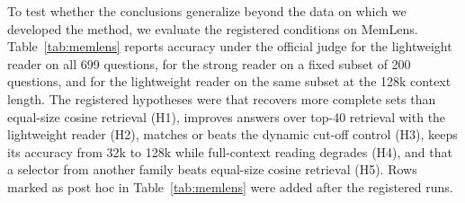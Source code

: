 To test whether the conclusions generalize beyond the data on which we developed the method, we evaluate the registered conditions on MemLens. Table~\ref{tab:memlens} reports accuracy under the official judge for the lightweight reader on all 699 questions, for the strong reader on a fixed subset of 200 questions, and for the lightweight reader on the same subset at the 128k context length. The registered hypotheses were that \qss{} recovers more complete sets than equal-size cosine retrieval (H1), improves answers over top-40 retrieval with the lightweight reader (H2), matches or beats the dynamic cut-off control (H3), keeps its accuracy from 32k to 128k while full-context reading degrades (H4), and that a selector from another family beats equal-size cosine retrieval (H5). Rows marked as post hoc in Table~\ref{tab:memlens} were added after the registered runs.

